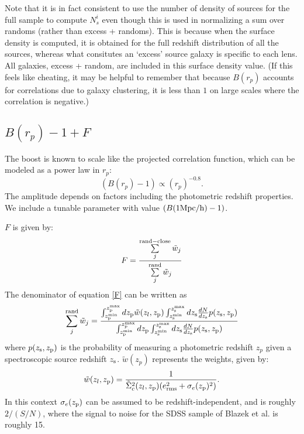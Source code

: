 \documentclass[onecolumn,amsmath,aps,fleqn, superscriptaddress]{revtex4}
\begin{document}
Note that it is in fact consistent to use the number of density of sources for the full sample to compute $N_s^i$ even though this is used in normalizing a sum over randoms (rather than excess + randoms). This is because when the surface density is computed, it is obtained for the full redshift distribution of all the sources, whereas what consitutes an `excess' source galaxy is specific to each lens. All galaxies, excess + random, are included in this surface density value. (If this feels like cheating, it may be helpful to remember that because $B(r_p)$ accounts for correlations due to galaxy clustering, it is less than $1$ on large scales where the correlation is negative.)

\subsection{$B(r_p)-1+F$}

The boost is known to scale like the projected correlation function, which can be modeled as a power law in $r_p$: 
\begin{equation}
(B(r_p)-1) \propto (r_p)^{-0.8}.
\label{boost}
\end{equation}
The amplitude depends on factors including the photometric redshift properties. We include a tunable parameter with value $(B(1 {\rm Mpc/h})-1)$.

$F$ is given by:
\begin{equation}
F= \frac{\sum\limits_{j}^{\rm rand-close}\tilde{w}_j}{\sum\limits_{j}^{\rm rand} \tilde{w}_j} 
\label{F}
\end{equation}
The denominator of equation \ref{F} can be written as
\begin{equation}
\sum\limits_{j}^{\rm rand} \tilde{w}_j = \frac{\int_{z_{\rm p}^{\rm min}}^{z_{\rm p}^{\rm max}} d z_{\rm p} \tilde{w}(z_l, z_{\rm p}) \int_{z_{\rm s}^{\rm min}}^{z_{\rm s}^{\rm max}} dz_{\rm s} \frac{dN}{dz_{\rm s}} p(z_{\rm s}, z_{\rm p})}{\int_{z_{\rm p}^{\rm min}}^{z_{\rm p}^{\rm max}} d z_{\rm p} \int_{z_{\rm s}^{\rm min}}^{z_{\rm s}^{\rm max}} dz_{\rm s} \frac{dN}{dz_{\rm s}} p(z_{\rm s}, z_{\rm p})}
\label{sumrandweights}
\end{equation}
where $p(z_{\rm s}, z_{\rm p})$ is the probability of measuring a photometric redshift $z_p$ given a spectroscopic source redshift $z_{\rm s}$. $\tilde{w}(z_p)$ represents the weights, given by:
\begin{equation}
\tilde{w}(z_l, z_{\rm p}) = \frac{1}{\tilde{\Sigma}_c^2(z_l, z_{\rm p})(e_{\rm rms}^2 + \sigma_e(z_{\rm p})^2)}.
\label{weights}
\end{equation}
In this context $\sigma_e(z_{\rm p})$ can be assumed to be redshift-independent, and is roughly $2 / (S/N)$, where the signal to noise for the SDSS sample of Blazek et al. is roughly 15.
\end{document}
